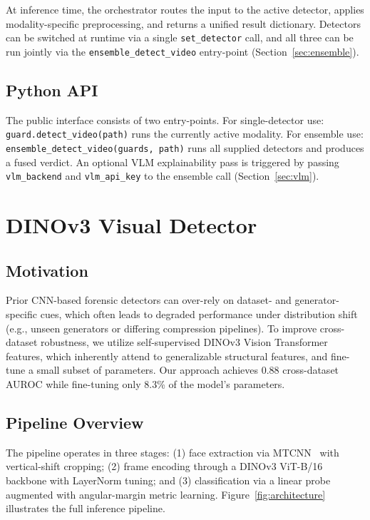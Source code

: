 \documentclass[conference]{IEEEtran}
\begin{document}
At inference time, the orchestrator routes the input to the active detector, applies modality-specific preprocessing, and returns a unified result dictionary. Detectors can be switched at runtime via a single \texttt{set\_detector} call, and all three can be run jointly via the \texttt{ensemble\_detect\_video} entry-point (Section~\ref{sec:ensemble}).

\subsection{Python API}
The public interface consists of two entry-points. For single-detector use: \texttt{guard.detect\_video(path)} runs the currently active modality. For ensemble use: \texttt{ensemble\_detect\_video(guards, path)} runs all supplied detectors and produces a fused verdict. An optional VLM explainability pass is triggered by passing \texttt{vlm\_backend} and \texttt{vlm\_api\_key} to the ensemble call (Section~\ref{sec:vlm}).


\section{DINOv3 Visual Detector} \label{sec:DINOv3}

\subsection{Motivation}
Prior CNN-based forensic detectors can over-rely on dataset- and generator-specific cues, which often leads to degraded performance under distribution shift (e.g., unseen generators or differing compression pipelines). To improve cross-dataset robustness, we utilize self-supervised DINOv3 Vision Transformer features, which inherently attend to generalizable structural features, and fine-tune a small subset of parameters. Our approach achieves 0.88 cross-dataset AUROC while fine-tuning only 8.3\% of the model's parameters.

\subsection{Pipeline Overview}
The pipeline operates in three stages: (1) face extraction via MTCNN~\cite{mtcnn} with vertical-shift cropping; (2) frame encoding through a DINOv3 ViT-B/16 backbone with LayerNorm tuning; and (3) classification via a linear probe augmented with angular-margin metric learning. Figure~\ref{fig:architecture} illustrates the full inference pipeline.
\end{document}
